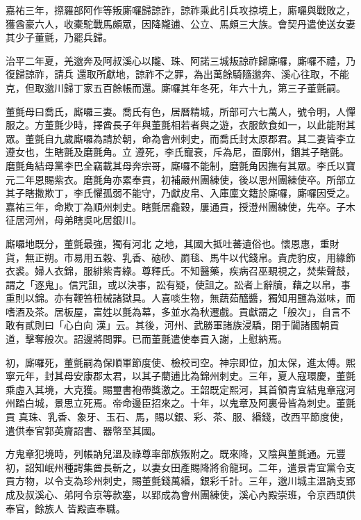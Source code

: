 \begin{pinyinscope}
 嘉祐三年，摖羅部阿作等叛廝囉歸諒詐，諒祚乘此引兵攻掠境上，廝囉與戰敗之，獲酋豪六人，收橐駝戰馬頗眾，因降隴逋、公立、馬頗三大族。會契丹遣使送女妻其少子董氈，乃罷兵歸。



 治平二年夏，羌邈奔及阿叔溪心以隴、珠、阿諾三城叛諒祚歸廝囉，廝囉不禮，乃復歸諒祚，請兵
 還取所獻地，諒祚不之罪，為出萬餘騎隨邈奔、溪心往取，不能克，但取邈川歸丁家五百餘帳而還。廝囉其年冬死，年六十九，第三子董氈嗣。



 董氈母曰喬氏，廝囉三妻。喬氏有色，居曆精城，所部可六七萬人，號令明，人憚服之。方董氈少時，擇酋長子年與董氈相若者與之遊，衣服飲食如一，以此能附其眾。董氈自九歲廝囉為請於朝，命為會州刺史，而喬氏封太原郡君。其二妻皆李立遵女也，生瞎氈及磨氈角。立
 遵死，李氏寵衰，斥為尼，置廓州，錮其子瞎氈。磨氈角結母黨李巴全竊載其母奔宗哥，廝囉不能制，磨氈角因撫有其眾。李氏以寶元二年恩賜紫衣。磨氈角亦累奉貢，初補嚴州團練使，後以思州團練使卒。所部立其子瞎撒欺丁，李氏懼孤弱不能守，乃獻皮帛、入庫廩文籍於廝囉，廝囉因受之。嘉祐三年，命欺丁為順州刺史。瞎氈居龕穀，屢通貢，授澄州團練使，先卒。子木征居河州，母弟瞎吳叱居銀川。



 廝囉地既分，董氈最強，獨有河北
 之地，其國大抵吐蕃遺俗也。懷恩惠，重財貨，無正朔。市易用五穀、乳香、硇砂、罽毯、馬牛以代錢帛。貴虎豹皮，用緣飾衣裘。婦人衣錦，服緋紫青綠。尊釋氏。不知醫藥，疾病召巫覡視之，焚柴聲鼓，謂之「逐鬼」。信咒詛，或以決事，訟有疑，使詛之。訟者上辭牘，藉之以帛，事重則以錦。亦有鞭笞杻械諸獄具。人喜啖生物，無蔬茹醯醬，獨知用鹽為滋味，而嗜酒及茶。居板屋，富姓以氈為幕，多並水為秋遷戲。貢獻謂之「般次」，自言不敢有貳則曰「心白向
 漢」云。其後，河州、武勝軍諸族浸驕，閉于闐諸國朝貢道，擊奪般次。詔邊將問罪。已而董氈遣使奉貢入謝，上慰納焉。



 初，廝囉死，董氈嗣為保順軍節度使、檢校司空。神宗即位，加太保，進太傅。熙寧元年，封其母安康郡太君，以其子藺逋比為錦州刺史。三年，夏人寇環慶，董氈乘虛入其境，大克獲。賜璽書袍帶獎激之。王韶既定熙河，其首領青宜結鬼章寇河州踏白城，景思立死焉。帝命邊臣招來之。十年，以鬼章及阿裏骨皆為刺史。董氈貢
 真珠、乳香、象牙、玉石、馬，賜以銀、彩、茶、服、緡錢，改西平節度使，遣供奉官郭英齎詔書、器幣至其國。



 方鬼章犯境時，列帳訥兒溫及祿尊率部族叛附之。既來降，又陰與董氈通。元豐初，詔知岷州種諤集酋長斬之，以妻女田產賜降將俞龍珂。二年，遣景青宜黨令支貢方物，以令支為珍州刺史，賜董氈錢萬緡，銀彩千計。三年，邈川城主溫訥支郢成及叔溪心、弟阿令京等款塞，以郢成為會州團練使，溪心內殿崇班，令京西頭供奉官，餘族人
 皆殿直奉職。




\end{pinyinscope}
